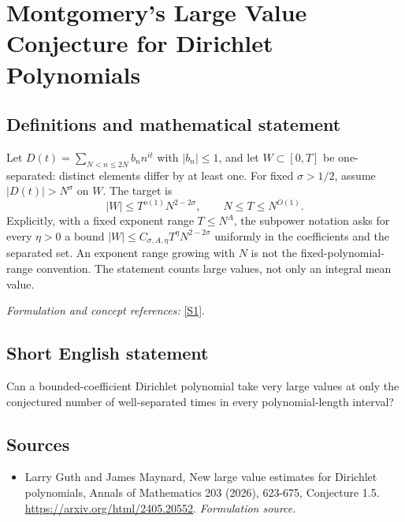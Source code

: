 \documentclass[11pt]{article}
\begin{document}
\section*{\texorpdfstring{Montgomery's Large Value Conjecture for Dirichlet Polynomials}{Montgomery's Large Value Conjecture for Dirichlet Polynomials}}\label{30006842}
\subsection{Definitions and mathematical statement}
Let $D(t)=\sum_{N<n\le2N}b_n n^{it}$ with $|b_n|\le1$, and let $W\subset[0,T]$ be one-separated: distinct elements differ by at least one. For fixed $\sigma>1/2$, assume $|D(t)|>N^\sigma$ on $W$. The target is
\[
 |W|\le T^{o(1)}N^{2-2\sigma},\qquad N\le T\le N^{O(1)}.
\]
Explicitly, with a fixed exponent range $T\le N^A$, the subpower notation asks for every $\eta>0$ a bound
$|W|\le C_{\sigma,A,\eta}T^\eta N^{2-2\sigma}$ uniformly in the coefficients and the separated set. An exponent range growing with $N$ is not the fixed-polynomial-range convention. The statement counts large values, not only an integral mean value.
\par\smallskip\textit{Formulation and concept references:} \href{https://arxiv.org/html/2405.20552}{[S1]}.

\subsection{Short English statement}
Can a bounded-coefficient Dirichlet polynomial take very large values at only the conjectured number of well-separated times in every polynomial-length interval?
\subsection{Sources}
\begin{itemize}
\item[S1]Larry Guth and James Maynard, New large value estimates for Dirichlet polynomials, Annals of Mathematics 203 (2026), 623-675, Conjecture 1.5.
\url{https://arxiv.org/html/2405.20552}.
\textit{Formulation source.}
\end{itemize}
\end{document}
